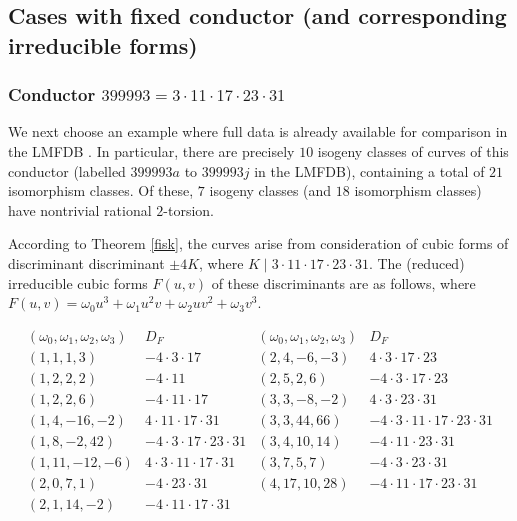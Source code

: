 \subsection{Cases with fixed conductor (and corresponding irreducible forms)}

\subsubsection{Conductor $399993 = 3 \cdot 11 \cdot 17 \cdot 23 \cdot 31$} \label{exe1}

We next choose an example where full data is already available for comparison in the LMFDB \cite{LMFDB}. In particular, there are precisely $10$ isogeny classes of curves of this conductor (labelled $399993a$ to $399993j$ in the LMFDB), containing a total of $21$ isomorphism classes. Of these, $7$ isogeny classes (and $18$ isomorphism classes) have nontrivial rational $2$-torsion.

According to Theorem \ref{fisk}, the curves arise from  consideration of cubic forms of discriminant discriminant $\pm 4  K$, where $K \mid 3 \cdot 11 \cdot 17 \cdot 23 \cdot 31$. 
The (reduced)  irreducible cubic forms $F(u,v)$ of these discriminants are as follows, where $F(u,v) =  \omega_0 u^3 + \omega_1 u^2v + \omega_2 uv^2 + \omega_3 v^3$.

$$
\begin{array}{cc|cc} 
(\omega_0,\omega_1,\omega_2,\omega_3) & D_F & (\omega_0,\omega_1,\omega_2,\omega_3)  & D_F \\ \hline
(1,1,1,3) & -4 \cdot 3 \cdot 17 & (2, 4, -6, -3) & 4 \cdot 3 \cdot 17 \cdot 23 \\
(1,2,2,2) & - 4 \cdot 11 & (2, 5, 2, 6) & -4 \cdot 3 \cdot 17 \cdot 23 \\
(1,2,2,6) & -4 \cdot 11 \cdot 17 & (3, 3, -8, -2) & 4 \cdot 3 \cdot 23 \cdot 31 \\
(1, 4, -16, -2) & 4 \cdot 11 \cdot 17 \cdot 31 & (3, 3, 44, 66) &  -4 \cdot 3 \cdot 11 \cdot 17 \cdot 23 \cdot 31 \\
(1, 8, -2, 42) & -4 \cdot 3 \cdot 17 \cdot 23 \cdot 31 & (3, 4, 10, 14) & -4  \cdot 11 \cdot 23 \cdot 31 \\
(1,11,-12,-6) & 4 \cdot 3 \cdot 11 \cdot 17 \cdot 31 & (3, 7, 5, 7) & -4 \cdot 3 \cdot 23 \cdot 31 \\
(2,0,7,1) & -4 \cdot  23 \cdot 31  & (4, 17, 10, 28) & -4 \cdot 11 \cdot 17 \cdot 23 \cdot 31 \\ 
(2, 1, 14, -2) & -4 \cdot 11 \cdot 17 \cdot 31 & & \\
\end{array}
$$


